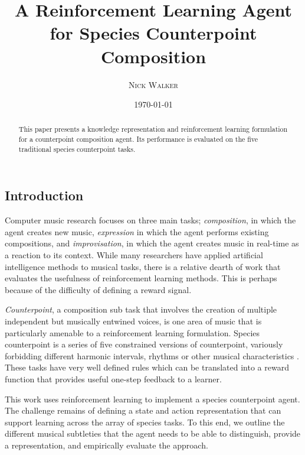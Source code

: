 \documentclass{article}
\title{A Reinforcement Learning Agent for Species Counterpoint Composition}
\author{\textsc{Nick Walker}}
\date{\today}
\begin{document}
	\maketitle %


\begin{multicols}{2}
	\begin{abstract}
	This paper presents a knowledge representation and reinforcement learning formulation for a counterpoint composition agent. Its performance is evaluated on the five traditional species counterpoint tasks.
	\end{abstract}


	\section{Introduction}

Computer music research focuses on three main tasks; \textit{composition}, in which the agent creates new music, \textit{expression} in which the agent performs existing compositions, and \textit{improvisation}, in which the agent creates music in real-time as a reaction to its context.  While many researchers have applied artificial intelligence methods to  musical tasks, there  is a relative dearth of work that evaluates the usefulness of reinforcement learning methods. This is perhaps because of the difficulty of defining a reward signal.

\textit{Counterpoint}, a composition sub task that involves the creation of  multiple independent but musically entwined voices, is one area of music that is particularly amenable to a reinforcement learning formulation. Species counterpoint is a series of five constrained versions of counterpoint, variously forbidding  different harmonic intervals, rhythms or other musical characteristics \cite{Kostka2012}. These tasks have very well defined rules which can be translated into a reward function that provides useful one-step feedback to a learner.

This work uses reinforcement learning to implement a species counterpoint agent. The challenge remains of defining a state and action representation that can support learning across the array of species tasks. To this end, we outline the different musical subtleties that the agent needs to be able to distinguish, provide a representation, and empirically evaluate the approach.


\end{multicols}
\end{document}
